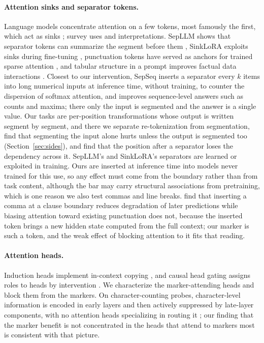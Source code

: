 \documentclass[10pt]{article} %
\begin{document}
\paragraph{Attention sinks and separator tokens.} Language models concentrate attention on a few tokens, most famously the first, which act as sinks \citep{xiao2024streaming, gu2024sink, zhang2025catch}; \citet{su2026sinksurvey} survey uses and interpretations. SepLLM shows that separator tokens can summarize the segment before them \citep{chen2024sepllm}, SinkLoRA exploits sinks during fine-tuning \citep{zhang2024sinklora}, punctuation tokens have served as anchors for trained sparse attention \citep{qiu2026phsa}, and tabular structure in a prompt improves factual data interactions \citep{oh2024tables}. Closest to our intervention, SepSeq \citep{sun2026sepseq} inserts a separator every $k$ items into long numerical inputs at inference time, without training, to counter the dispersion of softmax attention, and improves sequence-level answers such as counts and maxima; there only the input is segmented and the answer is a single value. Our tasks are per-position transformations whose output is written segment by segment, and there we separate re-tokenization from segmentation, find that segmenting the input alone hurts unless the output is segmented too (Section~\ref{sec:sides}), and find that the position after a separator loses the dependency across it. SepLLM's and SinkLoRA's separators are learned or exploited in training. Ours are inserted at inference time into models never trained for this use, so any effect must come from the boundary rather than from task content, although the bar may carry structural associations from pretraining, which is one reason we also test commas and line breaks. \citet{dangal2026anchoring} find that inserting a comma at a clause boundary reduces degradation of later predictions while biasing attention toward existing punctuation does not, because the inserted token brings a new hidden state computed from the full context; our marker is such a token, and the weak effect of blocking attention to it fits that reading.

\paragraph{Attention heads.} Induction heads implement in-context copying \citep{olsson2022induction}, and causal head gating assigns roles to heads by intervention \citep{nam2025headgating}. We characterize the marker-attending heads and block them from the markers. On character-counting probes, character-level information is encoded in early layers and then actively suppressed by late-layer components, with no attention heads specializing in routing it \citep{datta2026suppression}; our finding that the marker benefit is not concentrated in the heads that attend to markers most is consistent with that picture.
\end{document}
